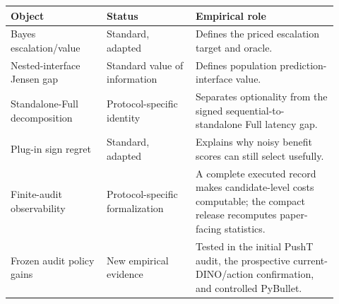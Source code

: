 \begin{tabular}{p{0.27\linewidth}p{0.25\linewidth}p{0.40\linewidth}}
\toprule
Object & Status & Empirical role \\
\midrule
Bayes escalation/value & Standard, adapted & Defines the priced escalation target and oracle. \\
Nested-interface Jensen gap & Standard value of information & Defines population prediction-interface value. \\
Standalone-Full decomposition & Protocol-specific identity & Separates optionality from the signed sequential-to-standalone Full latency gap. \\
Plug-in sign regret & Standard, adapted & Explains why noisy benefit scores can still select usefully. \\
Finite-audit observability & Protocol-specific formalization & A complete executed record makes candidate-level costs computable; the compact release recomputes paper-facing statistics. \\
Frozen audit policy gains & New empirical evidence & Tested in the initial PushT audit, the prospective current-DINO/action confirmation, and controlled PyBullet. \\
\bottomrule
\end{tabular}

